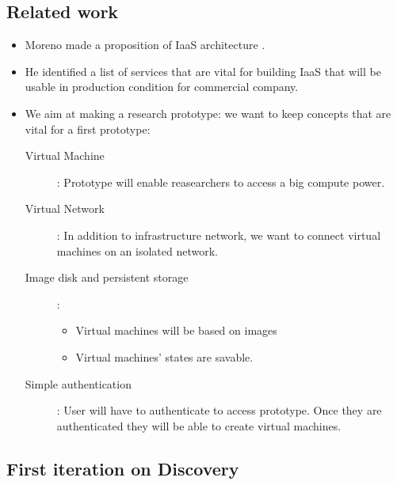 \subsection{Related work}

\begin{itemize}

	\item Moreno made a proposition of IaaS architecture \cite{moreno2012iaas}.	
	
	\item He identified a list of services that are vital for building IaaS that will be usable in production condition for commercial company.

	\item We aim at making a research prototype: we want to keep concepts that are vital for a first prototype:

		\begin{description}

			\item [Virtual Machine] : Prototype will enable reasearchers to access a big compute power.

			\item [Virtual Network] : In addition to infrastructure network, we want to connect virtual machines on an isolated network.

			\item [Image disk and persistent storage] : 
				\begin{itemize}

					\item Virtual machines will be based on images

					\item Virtual machines' states are savable.
				
				\end{itemize}

			\item [Simple authentication] : User will have to authenticate to access prototype. Once they are authenticated they will be able to create virtual machines.

		\end{description}

\end{itemize}

\subsection{First iteration on Discovery}

